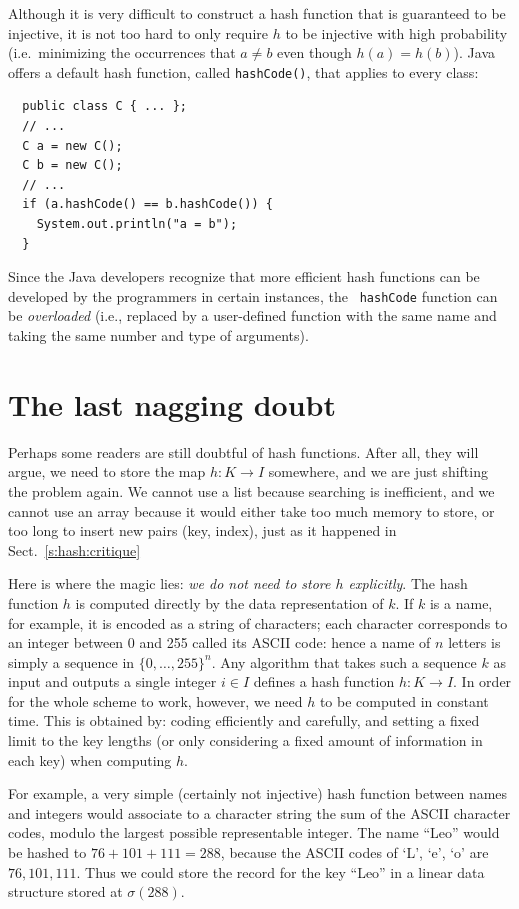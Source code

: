 \documentclass[a4paper]{book}
\theoremstyle{changebreak}                %
\begin{document}
Although it is very difficult to construct a hash function that is
guaranteed to be injective, it is not too hard to only require $h$ to
be injective with high probability (i.e.~minimizing the occurrences
that $a\not=b$ even though $h(a)=h(b)$). Java offers a default hash
function, called {\tt hashCode()}, that applies
to every class:
\begin{verbatim}
  public class C { ... };
  // ...
  C a = new C();
  C b = new C();
  // ...
  if (a.hashCode() == b.hashCode()) {
    System.out.println("a = b");
  }
\end{verbatim}
Since the Java developers recognize that more efficient hash functions
can be developed by the programmers in certain instances, the {\tt
  hashCode} function can be {\it
  overloaded} (i.e., replaced by a
user-defined function with the same name and taking the same number
and type of arguments). 

\section{The last nagging doubt}
Perhaps some readers are still doubtful of hash functions. After all,
they will argue, we need to store the map $h:K\to I$
somewhere, and we are just shifting the problem again. We cannot use a
list because searching is inefficient, and we cannot use
an array because it would either take too much memory to
store, or too long to insert new pairs (key, index), just as it
happened in Sect.~\ref{s:hash:critique}

Here is where the magic lies: {\it we do not need to store $h$
  explicitly}. The hash function $h$ is computed directly by the data
representation of $k$. If $k$ is a name, for example, it is encoded as
a string of characters; each character corresponds to an integer
between 0 and 255 called its ASCII code: hence a name of
$n$ letters is simply a sequence in $\{0,\ldots,255\}^n$. Any
algorithm that takes such a sequence $k$ as input and outputs a single
integer $i\in I$ defines a hash function $h:K\to I$. In order for the
whole scheme to work, however, we need $h$ to be computed in constant
time. This is obtained by: coding efficiently and carefully, and
setting a fixed limit to the key lengths (or only considering a fixed
amount of information in each key) when computing $h$.

For example, a very simple (certainly not injective) hash function
between names and integers would associate to a character string the
sum of the ASCII character codes, modulo the largest possible
representable integer. The name ``Leo'' would be hashed to
$76+101+111=288$, because the ASCII codes of `L', `e', `o' are
$76,101,111$. Thus we could store the record for the key ``Leo'' in a
linear data structure stored at $\sigma(288)$.
\end{document}
